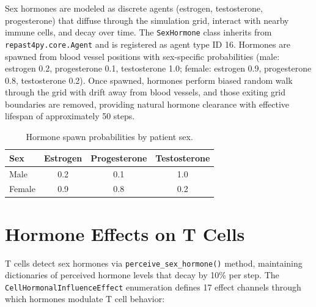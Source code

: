Sex hormones are modeled as discrete agents (estrogen, testosterone, progesterone) that diffuse through the simulation grid, interact with nearby immune cells, and decay over time. The \texttt{SexHormone} class inherits from \texttt{repast4py.core.Agent} and is registered as agent type ID 16. Hormones are spawned from blood vessel positions with sex-specific probabilities (male: estrogen 0.2, progesterone 0.1, testosterone 1.0; female: estrogen 0.9, progesterone 0.8, testosterone 0.2). Once spawned, hormones perform biased random walk through the grid with drift away from blood vessels, and those exiting grid boundaries are removed, providing natural hormone clearance with effective lifespan of approximately 50 steps.

\begin{table}[H]
\centering
\caption{Hormone spawn probabilities by patient sex.}
\label{tab:hormone-spawn}
\begin{tabular}{lccc}
\toprule
\textbf{Sex} & \textbf{Estrogen} & \textbf{Progesterone} & \textbf{Testosterone} \\
\midrule
Male   & 0.2 & 0.1 & 1.0 \\
Female & 0.9 & 0.8 & 0.2 \\
\bottomrule
\end{tabular}
\end{table}

\section{Hormone Effects on T Cells}
\label{sec:hormone-effects}

T cells detect sex hormones via \texttt{perceive\_sex\_hormone()} method, maintaining dictionaries of perceived hormone levels that decay by 10\% per step. The \texttt{CellHormonalInfluenceEffect} enumeration defines 17 effect channels through which hormones modulate T cell behavior:

